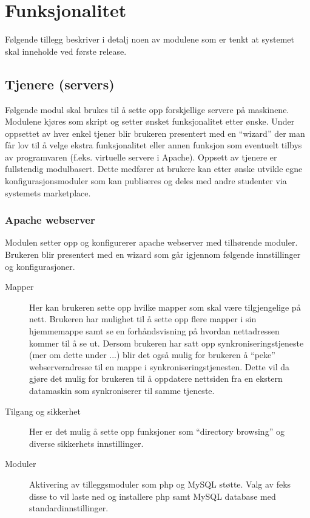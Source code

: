 \chapter{Funksjonalitet} \label{app:funksjonalitet}
Følgende tillegg beskriver i detalj noen av modulene som er tenkt at systemet skal inneholde ved første release.


\section{Tjenere (servers)}
Følgende modul skal brukes til å sette opp forskjellige servere på maskinene. Modulene kjøres som skript og setter ønsket funksjonalitet etter ønske. Under oppsettet av hver enkel tjener blir brukeren presentert med en “wizard” der man får lov til å velge ekstra funksjonalitet eller annen funksjon som eventuelt tilbys av programvaren (f.eks. virtuelle servere i Apache). Oppsett av tjenere er fullstendig modulbasert. Dette medfører at brukere kan etter ønske utvikle egne konfigurasjonsmoduler som kan publiseres og deles med andre studenter via systemets marketplace. 

\subsection{Apache webserver}
Modulen setter opp og konfigurerer apache webserver med tilhørende moduler. Brukeren blir presentert med en wizard som går igjennom følgende innstillinger og konfigurasjoner.
\begin{description}

\item[Mapper] Her kan brukeren sette opp hvilke mapper som skal være tilgjengelige på nett. Brukeren har mulighet til å sette opp flere mapper i sin hjemmemappe samt se en forhåndsvisning på hvordan nettadressen kommer til å se ut. Dersom brukeren har satt opp synkroniseringstjeneste (mer om dette under ...) blir det også mulig for brukeren å “peke” webserveradresse til en mappe i synkroniseringstjenesten. Dette vil da gjøre det mulig for brukeren til å oppdatere nettsiden fra en ekstern datamaskin som synkroniserer til samme tjeneste.

\item[Tilgang og sikkerhet] Her er det mulig å sette opp funksjoner som “directory browsing” og diverse sikkerhets innstillinger.

\item[Moduler] Aktivering av tilleggsmoduler som php og MySQL støtte. Valg av feks disse to vil laste ned og installere php samt MySQL database med standardinnstillinger.
\end{description}

